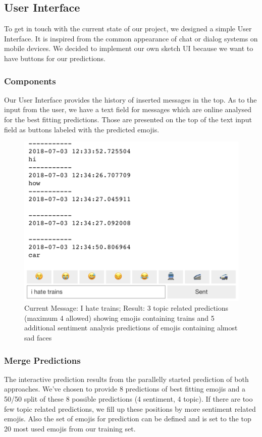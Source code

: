 \documentclass{article}
\begin{document}
\subsection{User Interface}
To get in touch with the current state of our project, we designed a simple User Interface. It is inspired from the common appearance of chat or dialog systems on mobile devices. We decided to implement our own sketch UI because we want to have buttons for our predictions.

\subsubsection{Components}
Our User Interface provides the history of inserted messages in the top. As to the input from the user, we have a text field for messages which are online analysed for the best fitting predictions. Those are presented on the top of the text input field as buttons labeled with the predicted emojis.

\begin{figure}[h!]
\centering
\includegraphics[scale=0.4]{images/user_interface}
\caption{Current Message: I hate trains; Result: 3 topic related predictions (maximum 4 allowed) showing emojis containing trains and 5 additional sentiment analysis predictions of emojis containing almost sad faces
}
\label{fig:user_interface}
\end{figure}

\subsubsection{Merge Predictions}
The interactive prediction results from the parallelly started prediction of both approaches. We’ve chosen to provide 8 predictions of best fitting emojis and a 50/50 split of these 8 possible predictions (4 sentiment, 4 topic). If there are too few topic related predictions, we fill up these positions by more sentiment related emojis. Also the set of emojis for prediction can be defined and is set to the top 20 most used emojis from our training set.
\end{document}
